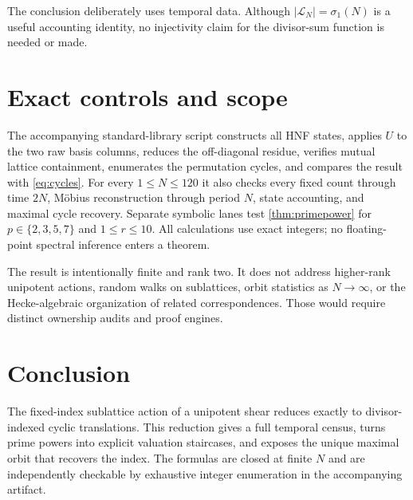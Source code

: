 \documentclass[11pt,a4paper]{amsart}
\newcommand{\cL}{\mathcal L}
\begin{document}
The conclusion deliberately uses temporal data.  Although
$|\cL_N|=\sigma_1(N)$ is a useful accounting identity, no injectivity claim
for the divisor-sum function is needed or made.

\section{Exact controls and scope}

The accompanying standard-library script constructs all HNF states, applies
$U$ to the two raw basis columns, reduces the off-diagonal residue, verifies
mutual lattice containment, enumerates the permutation cycles, and compares
the result with \cref{eq:cycles}.  For every
$1\leq N\leq120$ it also checks every fixed count through time $2N$,
M\"obius reconstruction through period $N$, state accounting, and maximal
cycle recovery.  Separate symbolic lanes test \cref{thm:primepower} for
$p\in\{2,3,5,7\}$ and $1\leq r\leq10$.  All calculations use exact
integers; no floating-point spectral inference enters a theorem.

The result is intentionally finite and rank two.  It does not address
higher-rank unipotent actions, random walks on sublattices, orbit statistics
as $N\to\infty$, or the Hecke-algebraic organization of related
correspondences.  Those would require distinct ownership audits and proof
engines.

\section{Conclusion}

The fixed-index sublattice action of a unipotent shear reduces exactly to
divisor-indexed cyclic translations.  This reduction gives a full temporal
census, turns prime powers into explicit valuation staircases, and exposes
the unique maximal orbit that recovers the index.  The formulas are closed
at finite $N$ and are independently checkable by exhaustive integer
enumeration in the accompanying artifact.



\end{document}

